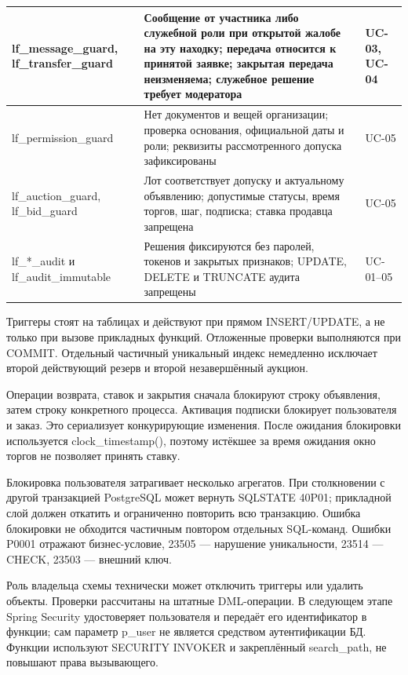 \begin{longtable}{|>{\RaggedRight\arraybackslash}p{0.30\tablecontentwidth}|>{\RaggedRight\arraybackslash}p{0.35\tablecontentwidth}|>{\RaggedRight\arraybackslash}p{0.35\tablecontentwidth}|}
lf\_\allowbreak{}message\_\allowbreak{}guard, lf\_\allowbreak{}transfer\_\allowbreak{}guard & Сообщение от участника либо служебной роли при открытой жалобе на эту находку; передача относится к принятой заявке; закрытая передача неизменяема; служебное решение требует модератора & UC-03, UC-04 \\ \hline
lf\_\allowbreak{}permission\_\allowbreak{}guard & Нет документов и вещей организации; проверка основания, официальной даты и роли; реквизиты рассмотренного допуска зафиксированы & UC-05 \\ \hline
lf\_\allowbreak{}auction\_\allowbreak{}guard, lf\_\allowbreak{}bid\_\allowbreak{}guard & Лот соответствует допуску и актуальному объявлению; допустимые статусы, время торгов, шаг, подписка; ставка продавца запрещена & UC-05 \\ \hline
lf\_\allowbreak{}*\_\allowbreak{}audit и lf\_\allowbreak{}audit\_\allowbreak{}immutable & Решения фиксируются без паролей, токенов и закрытых признаков; UPDATE, DELETE и TRUNCATE аудита запрещены & UC-01–05 \\ \hline
\end{longtable}
\endgroup

Триггеры стоят на таблицах и действуют при прямом INSERT/\allowbreak{}UPDATE, а не только при вызове прикладных функций. Отложенные проверки выполняются при COMMIT. Отдельный частичный уникальный индекс немедленно исключает второй действующий резерв и второй незавершённый аукцион.

Операции возврата, ставок и закрытия сначала блокируют строку объявления, затем строку конкретного процесса. Активация подписки блокирует пользователя и заказ. Это сериализует конкурирующие изменения. После ожидания блокировки используется clock\_\allowbreak{}timestamp(), поэтому истёкшее за время ожидания окно торгов не позволяет принять ставку.

Блокировка пользователя затрагивает несколько агрегатов. При столкновении с другой транзакцией Postgre\allowbreak{}SQL может вернуть SQLSTATE 40P01; прикладной слой должен откатить и ограниченно повторить всю транзакцию. Ошибка блокировки не обходится частичным повтором отдельных SQL-команд. Ошибки P0001 отражают бизнес-условие, 23505 — нарушение уникальности, 23514 — CHECK, 23503 — внешний ключ.

Роль владельца схемы технически может отключить триггеры или удалить объекты. Проверки рассчитаны на штатные DML-операции. В следующем этапе Spring Security удостоверяет пользователя и передаёт его идентификатор в функции; сам параметр p\_\allowbreak{}user не является средством аутентификации БД. Функции используют SECURITY INVOKER и закреплённый search\_\allowbreak{}path, не повышают права вызывающего.

